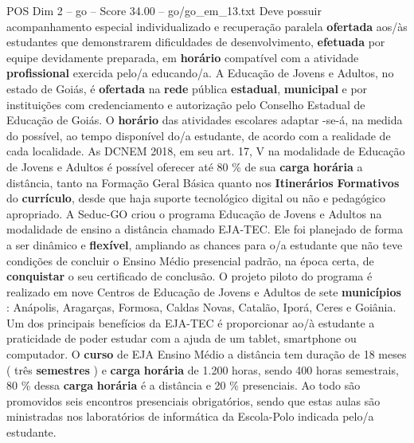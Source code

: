\begin{textsample}{POS Dim 2 – go – Score 34.00 – go/go\_em\_13.txt}
Deve possuir acompanhamento especial individualizado e recuperação paralela \textbf{ofertada} aos/às estudantes que demonstrarem dificuldades de desenvolvimento, \textbf{efetuada} por equipe devidamente preparada, em \textbf{horário} compatível com a atividade \textbf{profissional} exercida pelo/a educando/a.
A Educação de Jovens e Adultos, no estado de Goiás, é \textbf{ofertada} na \textbf{rede} pública \textbf{estadual}, \textbf{municipal} e por instituições com credenciamento e autorização pelo Conselho Estadual de Educação de Goiás.
O \textbf{horário} das atividades escolares adaptar -se-á, na medida do possível, ao tempo disponível do/a estudante, de acordo com a realidade de cada localidade.
As DCNEM 2018, em seu art. 17, V na modalidade de Educação de Jovens e Adultos é possível oferecer até 80 \% de sua \textbf{carga} \textbf{horária} a distância, tanto na Formação Geral Básica quanto nos \textbf{Itinerários} \textbf{Formativos} do \textbf{currículo}, desde que haja suporte tecnológico digital ou não e pedagógico apropriado.
A Seduc-GO criou o programa Educação de Jovens e Adultos na modalidade de ensino a distância chamado EJA-TEC.
Ele foi planejado de forma a ser dinâmico e \textbf{flexível}, ampliando as chances para o/a estudante que não teve condições de concluir o Ensino Médio presencial padrão, na época certa, de \textbf{conquistar} o seu certificado de conclusão.
O projeto piloto do programa é realizado em nove Centros de Educação de Jovens e Adultos de sete \textbf{municípios} : Anápolis, Aragarças, Formosa, Caldas Novas, Catalão, Iporá, Ceres e Goiânia.
Um dos principais benefícios da EJA-TEC é proporcionar ao/à estudante a praticidade de poder estudar com a ajuda de um tablet, smartphone ou computador.
O \textbf{curso} de EJA Ensino Médio a distância tem duração de 18 meses ( três \textbf{semestres} ) e \textbf{carga} \textbf{horária} de 1.200 horas, sendo 400 horas semestrais, 80 \% dessa \textbf{carga} \textbf{horária} é a distância e 20 \% presenciais.
Ao todo são promovidos seis encontros presenciais obrigatórios, sendo que estas aulas são ministradas nos laboratórios de informática da Escola-Polo indicada pelo/a estudante.

\end{textsample}
